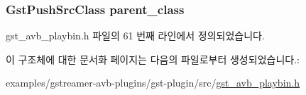 \subsubsection[{\texorpdfstring{parent\+\_\+class}{parent_class}}]{\setlength{\rightskip}{0pt plus 5cm}Gst\+Push\+Src\+Class parent\+\_\+class}\hypertarget{struct___gst_a_v_b_src_class_a9b486ae54be8b5539d90a52bef6e91dd}{}\label{struct___gst_a_v_b_src_class_a9b486ae54be8b5539d90a52bef6e91dd}


gst\+\_\+avb\+\_\+playbin.\+h 파일의 61 번째 라인에서 정의되었습니다.



이 구조체에 대한 문서화 페이지는 다음의 파일로부터 생성되었습니다.\+:\begin{DoxyCompactItemize}
\item 
examples/gstreamer-\/avb-\/plugins/gst-\/plugin/src/\hyperlink{gst__avb__playbin_8h}{gst\+\_\+avb\+\_\+playbin.\+h}\end{DoxyCompactItemize}
